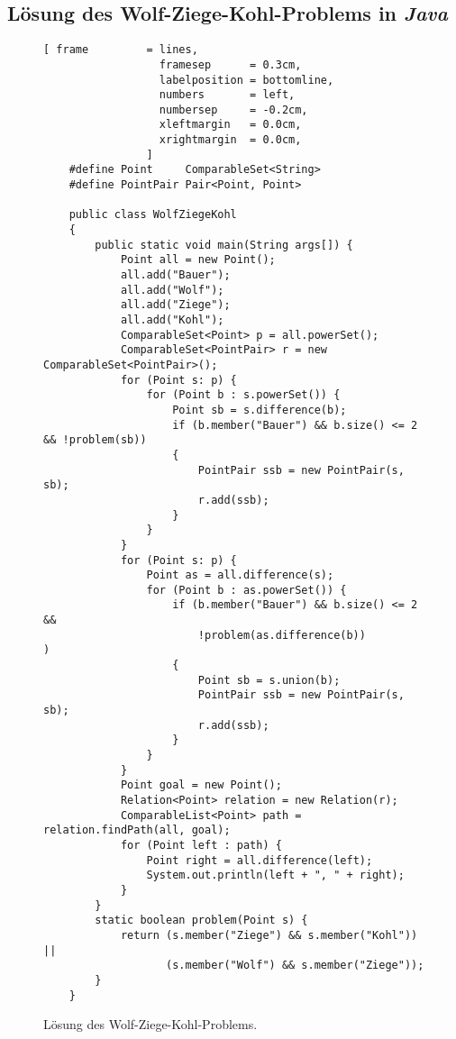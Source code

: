 \subsection{L\"osung des Wolf-Ziege-Kohl-Problems in \textsl{Java}}

\begin{figure}[!h]
\centering
\begin{Verbatim}[ frame         = lines, 
                  framesep      = 0.3cm, 
                  labelposition = bottomline,
                  numbers       = left,
                  numbersep     = -0.2cm,
                  xleftmargin   = 0.0cm,
                  xrightmargin  = 0.0cm,
                ]
    #define Point     ComparableSet<String>
    #define PointPair Pair<Point, Point>
    
    public class WolfZiegeKohl 
    {    
        public static void main(String args[]) {
            Point all = new Point();
            all.add("Bauer");
            all.add("Wolf");
            all.add("Ziege");
            all.add("Kohl");
            ComparableSet<Point> p = all.powerSet();
            ComparableSet<PointPair> r = new ComparableSet<PointPair>();
            for (Point s: p) {
                for (Point b : s.powerSet()) {
                    Point sb = s.difference(b);
                    if (b.member("Bauer") && b.size() <= 2 && !problem(sb)) 
                    {
                        PointPair ssb = new PointPair(s, sb);
                        r.add(ssb); 
                    }
                }
            }
            for (Point s: p) {
                Point as = all.difference(s);
                for (Point b : as.powerSet()) {
                    if (b.member("Bauer") && b.size() <= 2 && 
                        !problem(as.difference(b))           ) 
                    {
                        Point sb = s.union(b);
                        PointPair ssb = new PointPair(s, sb);
                        r.add(ssb); 
                    }
                }
            }
            Point goal = new Point();
            Relation<Point> relation = new Relation(r);
            ComparableList<Point> path = relation.findPath(all, goal);
            for (Point left : path) {
                Point right = all.difference(left);
                System.out.println(left + ", " + right);
            }
        }
        static boolean problem(Point s) {
            return (s.member("Ziege") && s.member("Kohl")) || 
                   (s.member("Wolf") && s.member("Ziege"));
        }
    }   
\end{Verbatim}
\vspace*{-0.3cm}
\caption{L\"osung des Wolf-Ziege-Kohl-Problems.}
\label{fig:WolfZiegeKohl.jpre}
\end{figure}



